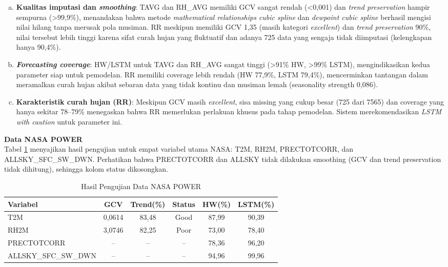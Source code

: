     \begin{enumerate}[(a)]
        \item \textbf{Kualitas imputasi dan \textit{smoothing}}:  
        TAVG dan RH\_AVG memiliki GCV sangat rendah (<0,001) dan \textit{trend preservation} hampir sempurna (>99,9\%), menandakan bahwa metode \textit{mathematical relationships cubic spline} dan \textit{dewpoint cubic spline} berhasil mengisi nilai hilang tanpa merusak pola musiman. RR meskipun memiliki GCV 1,35 (masih kategori \textit{excellent}) dan \textit{trend preservation} 90\%, nilai tersebut lebih tinggi karena sifat curah hujan yang fluktuatif dan adanya 725 data yang sengaja tidak diimputasi (kelengkapan hanya 90,4\%).  

        \item \textbf{\textit{Forecasting coverage}}:
        HW/LSTM untuk TAVG dan RH\_AVG sangat tinggi (>91\% HW, >99\% LSTM), mengindikasikan kedua parameter siap untuk pemodelan. RR memiliki coverage lebih rendah (HW 77,9\%, LSTM 79,4\%), mencerminkan tantangan dalam meramalkan curah hujan akibat sebaran data yang tidak kontinu dan musiman lemah (seasonality strength 0,086).  

        \item \textbf{Karakteristik curah hujan (RR)}:  
        Meskipun GCV masih \textit{excellent}, sisa missing yang cukup besar (725 dari 7565) dan coverage yang hanya sekitar 78–79\% menegaskan bahwa RR memerlukan perlakuan khusus pada tahap pemodelan. Sistem merekomendasikan \textit{LSTM with caution} untuk parameter ini.
    \end{enumerate}
    \noindent\textbf{Data NASA POWER} \\
    Tabel \ref{tab:nasa_datatest} menyajikan hasil pengujian untuk empat variabel utama NASA: T2M, RH2M, PRECTOTCORR, dan ALLSKY\_SFC\_SW\_DWN. Perhatikan bahwa PRECTOTCORR dan ALLSKY tidak dilakukan smoothing (GCV dan trend preservation tidak dihitung), sehingga kolom status dikosongkan.
    \begin{table}[H]
        \centering
        \caption{Hasil Pengujian Data NASA POWER}
        \label{tab:nasa_datatest}
        \small
        \renewcommand{\arraystretch}{1.2}
        \setlength{\tabcolsep}{6pt}
        \begin{tabular}{|l|c|c|c|c|c|}
        \hline
        \textbf{Variabel} & \textbf{GCV} & \textbf{Trend(\%)} & \textbf{Status} & \textbf{HW(\%)} & \textbf{LSTM(\%)} \\
        \hline
        T2M & 0,0614 & 83,48 & Good & 87,99 & 90,39 \\
        \hline
        RH2M & 3,0746 & 82,25 & Poor & 73,00 & 78,40 \\
        \hline
        PRECTOTCORR & – & – & – & 78,36 & 96,20 \\
        \hline
        ALLSKY\_SFC\_SW\_DWN & – & – & – & 94,96 & 99,96 \\
        \hline
        \end{tabular}
    \end{table}

